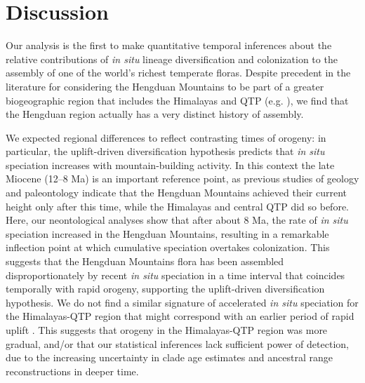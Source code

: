 \section{Discussion}

Our analysis is the first to make quantitative temporal inferences about the relative contributions of \textit{in situ} lineage diversification and colonization to the assembly of one of the world's richest temperate floras. Despite precedent in the literature for considering the Hengduan Mountains to be part of a greater biogeographic region that includes the Himalayas and QTP (e.g. \citealt{Zhang2014,Nie2013,GaoY2013,Matuszak2016}), we find that the Hengduan region actually has a very distinct history of assembly.

We expected regional differences to reflect contrasting times of orogeny: in particular, the uplift-driven diversification hypothesis predicts that \textit{in situ} speciation increases with mountain-building activity. In this context the late Miocene (12--8 Ma) is an important reference point, as previous studies of geology and paleontology indicate that the Hengduan Mountains achieved their current height only after this time, while the Himalayas and central QTP did so before. Here, our neontological analyses show that after about 8 Ma, the rate of \textit{in situ} speciation increased in the Hengduan Mountains, resulting in a remarkable inflection point at which cumulative speciation overtakes colonization. This suggests that the Hengduan Mountains flora has been assembled disproportionately by recent \textit{in situ} speciation in a time interval that coincides temporally with rapid orogeny, supporting the uplift-driven diversification hypothesis. We do not find a similar signature of accelerated \textit{in situ} speciation for the Himalayas-QTP region that might correspond with an earlier period of rapid uplift \citep{WangY2007,Mao2010}. This suggests that orogeny in the Himalayas-QTP region was more gradual, and/or that our statistical inferences lack sufficient power of detection, due to the increasing uncertainty in clade age estimates and ancestral range reconstructions in deeper time.




